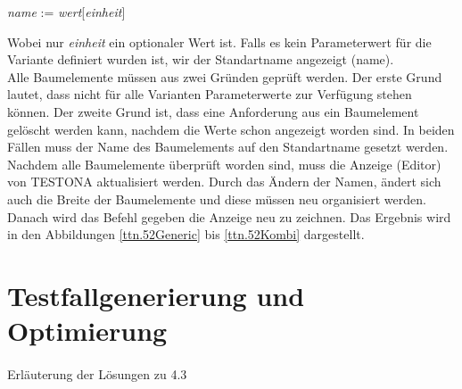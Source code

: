\begin{center}
\textit{name} := \textit{wert}[\textit{einheit}]
\end{center}

Wobei nur \textit{einheit} ein optionaler Wert ist. Falls es kein Parameterwert für die Variante definiert wurden ist, wir der Standartname angezeigt (name).\\

Alle Baumelemente müssen aus zwei Gründen geprüft werden. Der erste Grund lautet, dass nicht für alle Varianten Parameterwerte zur Verfügung stehen können. Der zweite Grund ist, dass eine Anforderung aus ein Baumelement gelöscht werden kann, nachdem die Werte schon angezeigt worden sind. In beiden Fällen muss der Name des Baumelements auf den Standartname gesetzt werden.\\


Nachdem alle Baumelemente überprüft worden sind, muss die Anzeige (Editor) von TESTONA aktualisiert werden. Durch das Ändern der Namen, ändert sich auch die Breite der Baumelemente und diese müssen neu organisiert werden. 
Danach wird das Befehl gegeben die Anzeige neu zu zeichnen. Das Ergebnis wird in den Abbildungen \ref{ttn.52Generic} bis \ref{ttn.52Kombi} dargestellt.



\newpage
\section{Testfallgenerierung und Optimierung}
\paragraph{}
Erläuterung der Lösungen zu 4.3